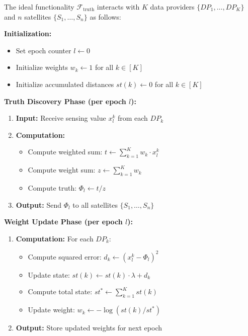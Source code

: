 \begin{definition}
\label{def:ideal_functionality}
The ideal functionality $\mathcal{F}_{\text{truth}}$ interacts with $K$ data providers $\{DP_1, \ldots, DP_K\}$ and $n$ satellites $\{S_1, \ldots, S_n\}$ as follows:

\textbf{Initialization:}
\begin{itemize}
    \item Set epoch counter $l \leftarrow 0$
    \item Initialize weights $w_k \leftarrow 1$ for all $k \in [K]$
    \item Initialize accumulated distances $st(k) \leftarrow 0$ for all $k \in [K]$
\end{itemize}

\textbf{Truth Discovery Phase (per epoch $l$):}
\begin{enumerate}
    \item \textbf{Input:} Receive sensing value $x_l^k$ from each $DP_k$
    \item \textbf{Computation:}
    \begin{itemize}
        \item Compute weighted sum: $t \leftarrow \sum_{k=1}^{K} w_k \cdot x_l^k$
        \item Compute weight sum: $z \leftarrow \sum_{k=1}^{K} w_k$
        \item Compute truth: $\Phi_l \leftarrow t / z$
    \end{itemize}
    \item \textbf{Output:} Send $\Phi_l$ to all satellites $\{S_1, \ldots, S_n\}$
\end{enumerate}

\textbf{Weight Update Phase (per epoch $l$):}
\begin{enumerate}
    \item \textbf{Computation:} For each $DP_k$:
    \begin{itemize}
        \item Compute squared error: $d_k \leftarrow (x_l^k - \Phi_l)^2$
        \item Update state: $st(k) \leftarrow st(k) \cdot \lambda + d_k$
        \item Compute total state: $st^* \leftarrow \sum_{k=1}^{K} st(k)$
        \item Update weight: $w_k \leftarrow -\log(st(k) / st^*)$
    \end{itemize}
    \item \textbf{Output:} Store updated weights for next epoch
\end{enumerate}
\end{definition}

